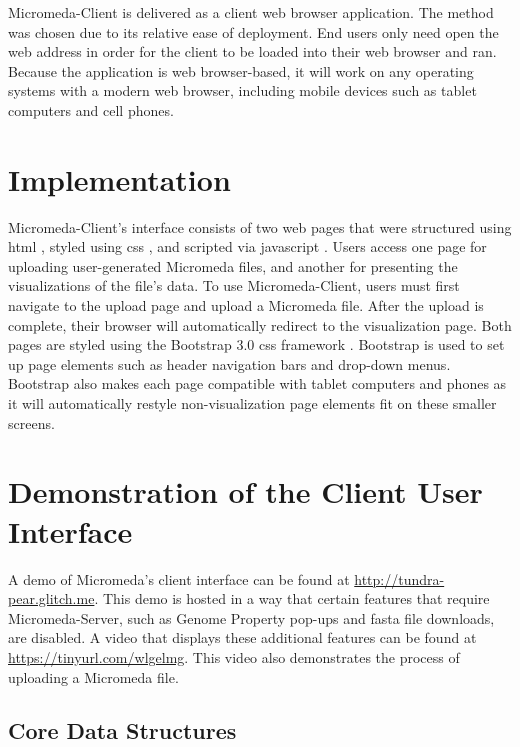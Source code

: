 Micromeda-Client is delivered as a client web browser application. The method 
was chosen due to its relative ease of deployment. End users only need open the 
web address in order for the client to be loaded into their web browser and ran. 
Because the application is web browser-based, it will work on any operating 
systems with a modern web browser, including mobile devices such as tablet 
computers and cell phones.

\section{Implementation} \label{client-implementation}

Micromeda-Client's interface consists of two web pages that were structured 
using \gls{html} \cite{HTML5}, styled using \gls{css} \cite{CSS3}, and scripted 
via \gls{javascript} \cite{flanagan2006javascript}. Users access one page for 
uploading user-generated Micromeda files, and another for presenting the 
visualizations of the file's data. To use Micromeda-Client, users must first 
navigate to the upload page and upload a Micromeda file. After the upload is 
complete, their browser will automatically redirect to the visualization page. 
Both pages are styled using the Bootstrap 3.0 \gls{css} framework 
\cite{spurlock2013bootstrap}. Bootstrap is used to set up page elements such as 
header navigation bars and drop-down menus. Bootstrap also makes each page 
compatible with tablet computers and phones as it will automatically restyle 
non-visualization page elements fit on these smaller screens.

\section{Demonstration of the Client User Interface} \label{client-demo}

A demo of Micromeda’s client interface can be found at
\href{http://tundra-pear.glitch.me}{http://tundra-pear.glitch.me}. This demo is 
hosted in a way that certain features that require Micromeda-Server, such as 
Genome Property pop-ups and \gls{fasta} file downloads, are disabled. A video 
that displays these additional features can be found at
\href{https://tinyurl.com/wlgelmg}{https://tinyurl.com/wlgelmg}. 
This video also demonstrates the process of uploading a Micromeda file.

\subsection{Core Data Structures} \label{visual-data-structures}

